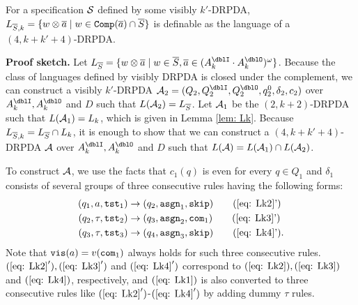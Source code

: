 \begin{lemma}\label{lem: LkS}
For a specification ${\cal S}$ defined by some visibly $k'$-DRPDA,
$L_{{\overline{S}}, k} = \{w\otimes{\overline{a}} \mid w\in{\mathtt{Comp}}({\overline{a}})\cap {\overline{S}}\}$
is definable as the language of a $(4,k+k'+4)$-DRPDA.
\end{lemma}
{\bf Proof sketch.}\quad
Let $L_{\overS} = \{w\otimes\overa\mid w\in\overS, \overa\in(A_k^\dblI\cdot A_k^\dblO)^\omega\}$.
Because the class of languages defined by visibly DRPDA is closed under the complement,
we can construct a visibly $k'$-DRPDA
$\calA_2=(Q_2, Q^\dblI_2, Q^\dblO_2, q^0_2, \delta_2, c_2)$
over $A^\dblI_{k}, A^\dblO_{k}$ and $D$
such that $L({\cal A}_2)= L_{{\overline{S}}}$.
Let ${\cal A}_1$ be the $(2,k+2)$-DRPDA
such that $L({\cal A}_1)=L_k$, which is given in Lemma \ref{lem: Lk}.
Because $L_{{\overline{S}}, k} = L_{{\overline{S}}} \cap L_k$, it is enough to show that we can construct a $(4,k+k'+4)$-DRPDA ${\cal A}$
over $A^\dblI_{k}, A^\dblO_{k}$ and $D$
such that $L({\cal A})=L({\cal A}_1)\cap L({\cal A}_2)$.

To construct ${\cal A}$, we use the facts that
$c_1(q)$ is even for every $q\in Q_1$ and
$\delta_1$ consists of several groups of three consecutive rules having the following forms:
\begin{align}
(q_1, a, \tst_1) &\to (q_2,\asgn_1, \skip) \tag{\ref{eq: Lk2}'}\\
(q_2, \tau, \tst_2) &\to (q_3,\asgn_2, \com_1) \tag{\ref{eq: Lk3}'}\\
(q_3, \tau, \tst_3) &\to (q_4,\asgn_3, \skip) \tag{\ref{eq: Lk4}'}.
\end{align}
Note that $\mathtt{vis}(a)=v(\mathtt{com}_1)$ always holds for such three consecutive rules.
$(\ref{eq: Lk2}'), (\ref{eq: Lk3}')$ and $(\ref{eq: Lk4}')$ correspond to $(\ref{eq: Lk2}), (\ref{eq: Lk3})$ and $(\ref{eq: Lk4})$, respectively, and $(\ref{eq: Lk1})$
is also converted to three consecutive rules like $(\ref{eq: Lk2}')$-$(\ref{eq: Lk4}')$
by adding dummy $\tau$ rules.

